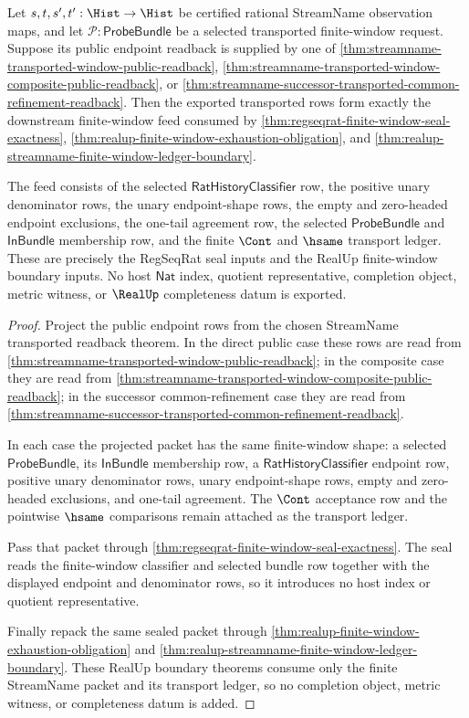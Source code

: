 \begin{theorem}
\label{thm:streamname-transported-window-regseqrat-realup-feed}
Let $s,t,s',t':\Hist\to\Hist$ be certified rational StreamName observation
maps, and let $\mathcal{P}:\mathsf{ProbeBundle}$ be a selected transported
finite-window request. Suppose its public endpoint readback is supplied by one
of
\autoref{thm:streamname-transported-window-public-readback},
\autoref{thm:streamname-transported-window-composite-public-readback}, or
\autoref{thm:streamname-successor-transported-common-refinement-readback}.
Then the exported transported rows form exactly the downstream finite-window
feed consumed by \autoref{thm:regseqrat-finite-window-seal-exactness},
\autoref{thm:realup-finite-window-exhaustion-obligation}, and
\autoref{thm:realup-streamname-finite-window-ledger-boundary}.

The feed consists of the selected $\mathsf{RatHistoryClassifier}$ row, the
positive unary denominator rows, the unary endpoint-shape rows, the empty and
zero-headed endpoint exclusions, the one-tail agreement row, the selected
$\mathsf{ProbeBundle}$ and $\mathsf{InBundle}$ membership row, and the finite
$\Cont$ and $\hsame$ transport ledger. These are precisely the RegSeqRat seal
inputs and the RealUp finite-window boundary inputs. No host $\mathsf{Nat}$
index, quotient representative, completion object, metric witness, or
$\RealUp$ completeness datum is exported.
\end{theorem}
\begin{proof}
Project the public endpoint rows from the chosen StreamName transported
readback theorem. In the direct public case these rows are read from
\autoref{thm:streamname-transported-window-public-readback}; in the composite
case they are read from
\autoref{thm:streamname-transported-window-composite-public-readback}; in the
successor common-refinement case they are read from
\autoref{thm:streamname-successor-transported-common-refinement-readback}.

In each case the projected packet has the same finite-window shape: a selected
$\mathsf{ProbeBundle}$, its $\mathsf{InBundle}$ membership row, a
$\mathsf{RatHistoryClassifier}$ endpoint row, positive unary denominator rows,
unary endpoint-shape rows, empty and zero-headed exclusions, and one-tail
agreement. The $\Cont$ acceptance row and the pointwise $\hsame$ comparisons
remain attached as the transport ledger.

Pass that packet through
\autoref{thm:regseqrat-finite-window-seal-exactness}. The seal reads the
finite-window classifier and selected bundle row together with the displayed
endpoint and denominator rows, so it introduces no host index or quotient
representative.

Finally repack the same sealed packet through
\autoref{thm:realup-finite-window-exhaustion-obligation} and
\autoref{thm:realup-streamname-finite-window-ledger-boundary}. These RealUp
boundary theorems consume only the finite StreamName packet and its
transport ledger, so no completion object, metric witness, or completeness
datum is added.
\end{proof}

